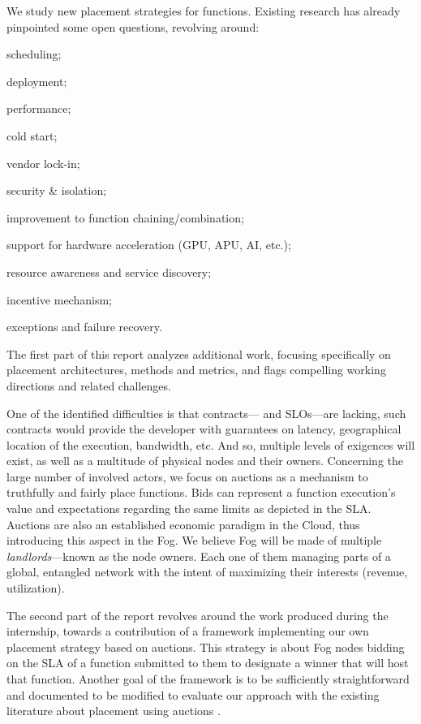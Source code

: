 We study new placement strategies for functions. Existing research \cite{kjorveziroski_iot_2021,xie_when_2021} has already pinpointed some open questions, revolving around:
\begin{enumerate*}[(1)]
	\item scheduling;
	\item deployment;
	\item performance;
	\item cold start;
	\item vendor lock-in;
	\item security \& isolation;
	\item improvement to function chaining/combination;
	\item support for hardware acceleration (\gls{GPU}, \gls{APU}, \gls{AI}, etc.);
	\item resource awareness and service discovery;
	\item incentive mechanism;
	\item exceptions and failure recovery.
\end{enumerate*}
The first part of this report analyzes additional work, focusing specifically on placement architectures, methods and metrics, and flags compelling working directions and related challenges.

One of the identified difficulties is that contracts— and \glspl{SLO}—are lacking, such contracts would provide the developer with guarantees on latency, geographical location of the execution, bandwidth, etc. And so, multiple levels of exigences will exist, as well as a multitude of physical nodes and their owners. Concerning the large number of involved actors, we focus on auctions as a mechanism to truthfully and fairly place functions. Bids can represent a function execution’s value and expectations regarding the same limits as depicted in the \gls{SLA}. Auctions are also an established economic paradigm in the Cloud, thus introducing this aspect in the Fog. We believe Fog will be made of multiple \emph{landlords}—known as the node owners. Each one of them managing parts of a global, entangled network with the intent of maximizing their interests (revenue, utilization).

The second part of the report revolves around the work produced during the internship, towards a contribution of a framework implementing our own placement strategy based on auctions. This strategy is about Fog nodes bidding on the \gls{SLA} of a function submitted to them to designate a winner that will host that function. Another goal of the framework is to be sufficiently straightforward and documented to be modified to evaluate our approach with the existing literature about placement using auctions \cite{bermbach_auctionwhisk_2021,tasiopoulos_fogspot_2019}.

